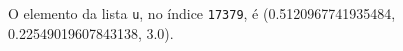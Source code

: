 \documentclass[12pt,varwidth=16cm,border=1pt]{standalone}
\begin{document}
O elemento da lista \verb+u+, no índice \verb+17379+, é (0.5120967741935484, 0.22549019607843138, 3.0).

\questiomtrue
\end{document}
